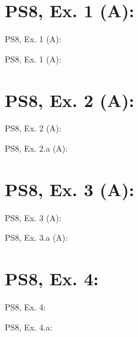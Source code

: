 \section{PS8, Ex. 1 (A): }

\begin{frame}{PS8, Ex. 1 (A): }
  \begin{multicols}{2}
    \vfill\null\columnbreak
    \vfill\null
  \end{multicols}
\end{frame}

\begin{frame}{PS8, Ex. 1 (A): }
  \begin{multicols}{2}
    \vfill\null\columnbreak
    \vfill\null
  \end{multicols}

\end{frame}



\section{PS8, Ex. 2 (A): }

\begin{frame}{PS8, Ex. 2 (A): }
  \begin{multicols}{2}
    \vfill\null\columnbreak
    \vfill\null
  \end{multicols}
\end{frame}

\begin{frame}{PS8, Ex. 2.a (A): }
  \begin{multicols}{2}
    \vfill\null\columnbreak
    \vfill\null
  \end{multicols}
\end{frame}



\section{PS8, Ex. 3 (A): }

\begin{frame}{PS8, Ex. 3 (A): }
  \begin{multicols}{2}
    \vfill\null\columnbreak
    \vfill\null
  \end{multicols}
\end{frame}

\begin{frame}{PS8, Ex. 3.a (A): }
  \begin{multicols}{2}
    \vfill\null\columnbreak
    \vfill\null
  \end{multicols}
\end{frame}



\section{PS8, Ex. 4: }

\begin{frame}{PS8, Ex. 4: }
  \begin{multicols}{2}
    \vfill\null\columnbreak
    \vfill\null
  \end{multicols}
\end{frame}

\begin{frame}{PS8, Ex. 4.a: }
  \begin{multicols}{2}
    \vfill\null\columnbreak
    \vfill\null\null
  \end{multicols}
\end{frame}
